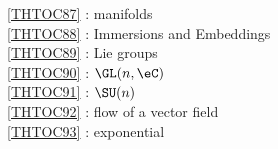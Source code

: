 \ref {THTOC87} : manifolds\\
\ref {THTOC88} : Immersions and Embeddings\\
\ref {THTOC89} : Lie groups\\
\ref {THTOC90} : \( \GL (n,\eC )\)\\
\ref {THTOC91} : \( \SU (n)\)\\
\ref {THTOC92} : flow of a vector field\\
\ref {THTOC93} : exponential\\
